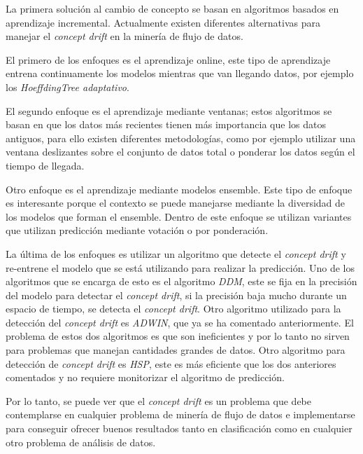 La primera solución al cambio de concepto se basan en algoritmos basados en aprendizaje incremental. Actualmente existen diferentes alternativas para manejar el \textit{concept drift} en la minería de flujo de datos.

El primero de los enfoques es el aprendizaje online, este tipo de aprendizaje entrena continuamente los modelos mientras que van llegando datos, por ejemplo los \textit{HoeffdingTree adaptativo}.

El segundo enfoque es el aprendizaje mediante ventanas; estos algoritmos se basan en que los datos más recientes tienen más importancia que los datos antiguos, para ello existen diferentes metodologías, como por ejemplo utilizar una ventana deslizantes sobre el conjunto de datos total o ponderar los datos según el tiempo de llegada.

Otro enfoque es el aprendizaje mediante modelos ensemble. Este tipo de enfoque es interesante porque el contexto se puede manejarse mediante la diversidad de los modelos que forman el ensemble. Dentro de este enfoque se utilizan variantes que utilizan predicción mediante votación o por ponderación.

La última de los enfoques es utilizar un algoritmo que detecte el \textit{concept drift} y re-entrene el modelo que se está utilizando para realizar la predicción. Uno de los algoritmos que se encarga de esto es el algoritmo \textit{DDM}, este se fija en la precisión del modelo para detectar el \textit{concept drift}, si la precisión baja mucho durante un espacio de tiempo, se detecta el \textit{concept drift}. Otro algoritmo utilizado para la detección del \textit{concept drift} es \textit{ADWIN}, que ya se ha comentado anteriormente. El problema de estos dos algoritmos es que son ineficientes y por lo tanto no sirven para problemas que manejan cantidades grandes de datos. Otro algoritmo para detección de \textit{concept drift} es \textit{HSP}, este es más eficiente que los dos anteriores comentados y no requiere monitorizar el algoritmo de predicción.

Por lo tanto, se puede ver que el \textit{concept drift} es un problema que debe contemplarse en cualquier problema de minería de flujo de datos e implementarse para conseguir ofrecer buenos resultados tanto en clasificación como en cualquier otro problema de análisis de datos.

